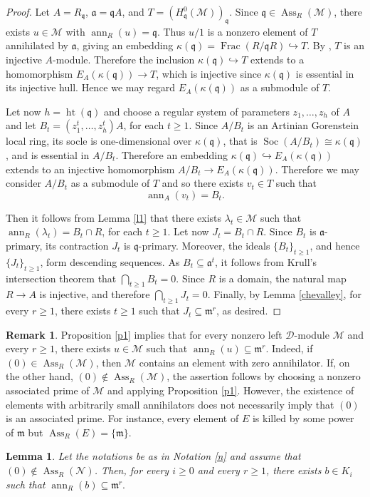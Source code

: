 \documentclass[11pt]{amsart}
\newtheorem{lemma}[theorem]{Lemma}
\theoremstyle{definition}
\newtheorem{remark}[theorem]{Remark}
\newcommand{\m}{\mathfrak m}
\newcommand{\q}{\mathfrak q}
\newcommand{\D}{\mathcal D}
\newcommand{\M}{\mathcal M}
\newcommand{\N}{\mathcal N}
\DeclareMathOperator{\ann}{ann}
\DeclareMathOperator{\Ass}{Ass}
\begin{document}
\begin{proof}
Let $A=R_{\q}$, $\mathfrak a=\q A$, and $T=(H_{\q}^0(\M))_{\q}$. Since $\q\in\Ass_R(\M)$, there exists $u\in \M$ with $\ann_R(u)=\q$. Thus $u/1$ is a nonzero element of $T$ annihilated by $\mathfrak a$, giving an embedding $\kappa(\q)=\operatorname{Frac}(R/{\q R})\hookrightarrow T$. By \cite[Lemma 3.4]{SZ}, $T$ is an injective $A$-module. Therefore the inclusion $\kappa(\q)\hookrightarrow T$  extends to a homomorphism $E_A(\kappa(\q))\to T$, which is injective since $\kappa(\q)$ is essential in its injective hull. Hence we may regard $E_A(\kappa(\q))$ as a submodule of $T$.

Let now $h=\operatorname{ht}(\mathfrak q)$ and choose a regular system of parameters $z_1,\ldots,z_h$ of $A$ and let $B_t=(z_1^t,\ldots,z_h^t)A$, for each $t\geq1$. Since $A/B_t$ is an Artinian Gorenstein local ring, its socle is one-dimensional over $\kappa(\q)$, that is $\operatorname{Soc}(A/B_t)\cong \kappa(\q)$, and is essential in $A/B_t$. Therefore an embedding $\kappa(\q)\hookrightarrow E_A(\kappa(\q))$ extends to an injective homomorphism $A/B_t\to E_A(\kappa(\q))$. Therefore we may consider  $A/B_t$  as a submodule of $T$ and so there exists $v_t\in T$ such that
\[
\ann_A(v_t)=B_t.
\]

Then it follows from Lemma \ref{l1} that there exists $\lambda_t\in \M$ such that $\ann_R(\lambda_t)=B_t\cap R$, for each $t\geq1$. Let now $J_t=B_t\cap R$. Since $B_t$ is $\mathfrak a$-primary, its contraction $J_t$ is $\q$-primary. Moreover, the ideals $\{B_t\}_{t\geq 1}$, and hence
$\{J_t\}_{t\geq 1}$, form descending sequences. As $B_t\subseteq\mathfrak a^t$, it follows from Krull's intersection theorem that $\bigcap_{t\geq1}B_t=0$. Since $R$ is a domain, the natural map $R\to A$ is injective, and therefore $\bigcap_{t\geq1}J_t=0$. Finally, by Lemma \ref{chevalley}, for every $r\geq1$, there exists $t\geq1$ such that $J_t\subseteq\mathfrak m^r$, as desired.
\end{proof}
\begin{remark}
Proposition \ref{p1} implies that for every nonzero left $\D$-module $\M$ and every $r\geq1$, there exists $u\in \M$ such that $\ann_R(u)\subseteq\m^r$. Indeed, if $(0)\in\Ass_R(\M)$, then $\M$ contains an element with zero annihilator. If, on the other hand, $(0)\notin\Ass_R(\M)$, the assertion follows by choosing a nonzero associated prime of $\M$ and applying Proposition \ref{p1}. However, the existence of elements with arbitrarily small annihilators does not necessarily imply that $(0)$ is an associated prime. For instance, every element of $E$ is killed by some power of  $\m$ but $\Ass_R(E)=\{\m\}$. 
\end{remark}
\begin{lemma}\label{l4}
Let the notations be as in Notation \ref{n}  and assume that $(0)\notin\Ass_R(\N)$. Then, for every $i\geq 0$ and every $r\geq 1$, there exists $b\in K_i$ such that $\ann_R(b)\subseteq\m^r.$
\end{lemma}
\end{document}
